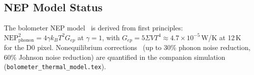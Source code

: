 \subsection{NEP Model Status}

The bolometer NEP model~\cite{Richards1994} is derived from first principles:
$\mathrm{NEP}_\mathrm{phonon}^2 = 4\gamma k_B T^2 G_{ep}$ at $\gamma = 1$, with
$G_{ep} = 5\Sigma V T^4 \approx 4.7 \times 10^{-5}$\,W/K at 12\,K for the D0 pixel.
Nonequilibrium corrections~\cite{Mather1982} (up to 30\% phonon noise reduction,
60\% Johnson noise reduction) are quantified in the companion simulation
(\texttt{bolometer\_thermal\_model.tex}).

